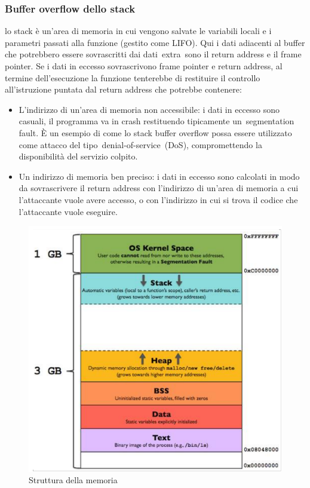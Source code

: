 \documentclass[8pt]{extarticle}
\begin{document}
\subsubsection{Buffer overflow dello stack}
lo stack è un’area di memoria in cui vengono salvate le variabili locali e i parametri passati alla funzione 
(gestito come LIFO). Qui i dati adiacenti al buffer che potrebbero essere sovrascritti dai dati extra sono 
il return address e il frame pointer. Se i dati in eccesso sovrascrivono frame pointer e return address, 
al termine dell’esecuzione la funzione tenterebbe di restituire il controllo all’istruzione puntata dal 
return address che potrebbe contenere:
\begin{itemize}
    \item L’indirizzo di un’area di memoria non accessibile: i dati in eccesso sono casuali, il programma 
    va in crash restituendo tipicamente un segmentation fault. È un esempio di come lo stack buffer 
    overflow possa essere utilizzato come attacco del tipo denial-of-service (DoS), compromettendo la 
    disponibilità del servizio colpito.
    \item Un indirizzo di memoria ben preciso: i dati in eccesso sono calcolati in modo da sovrascrivere 
    il return address con l’indirizzo di un’area di memoria a cui l’attaccante vuole avere accesso, o con 
    l’indirizzo in cui si trova il codice che l’attaccante vuole eseguire.
\end{itemize}
\begin{figure}[H]
    \center
    \includegraphics[scale=0.2]{images/BO2.png}
    \caption{Struttura della memoria}\label{fig:1}
\end{figure}
\end{document}

